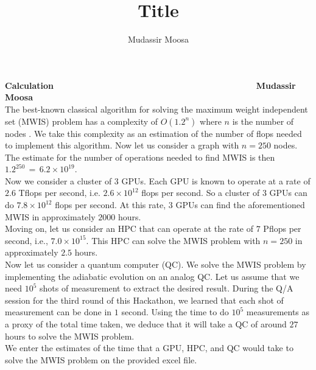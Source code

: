 \documentclass[10pt]{article}
\title{Title}
\author{Mudassir Moosa\\\date{ }}
\begin{document}
{\bf Calculation $\quad\quad\quad\quad\quad\quad\quad\quad\quad\quad\quad\quad\quad\quad\quad\quad\quad\quad\quad\quad\quad\quad\quad$ Mudassir Moosa}	\\

The best-known classical algorithm for solving the maximum weight independent set (MWIS) problem has a complexity of $O(1.2^{n})$ where $n$ is the number of nodes \cite{2013arXiv1312.6260X}. We take this complexity as an estimation of the number of flops needed to implement this algorithm. Now let us consider a graph with $n=250$ nodes. The estimate for the number of operations needed to find MWIS is then $1.2^{250} \, = \, 6.2\times 10^{19}$.\\

Now we consider a cluster of $3$ GPUs. Each GPU is known to operate at a rate of $2.6$ Tflops per second, i.e. $2.6 \times 10^{12}$ flops per second. So a cluster of $3$ GPUs can do $7.8\times 10^{12}$ flops per second. At this rate, $3$ GPUs can find the aforementioned MWIS in approximately $2000$ hours. \\

Moving on, let us consider an HPC that can operate at the rate of $7 $ Pflops per second, i.e., $7.0\times 10^{15}$. This HPC can solve the MWIS problem with $n=250$ in approximately $2.5$ hours.\\

Now let us consider a quantum computer (QC). We solve the MWIS problem by implementing the adiabatic evolution on an analog QC. Let us assume that we need $10^5$ shots of measurement to extract the desired result. During the Q/A session for the third round of this Hackathon, we learned that each shot of measurement can be done in $1$ second. Using the time to do $10^5$ measurements as a proxy of the total time taken, we deduce that it will take a QC of around $27$ hours to solve the MWIS problem. \\

We enter the estimates of the time that a GPU, HPC, and QC would take to solve the MWIS problem on the provided excel file. \\







\end{document}
